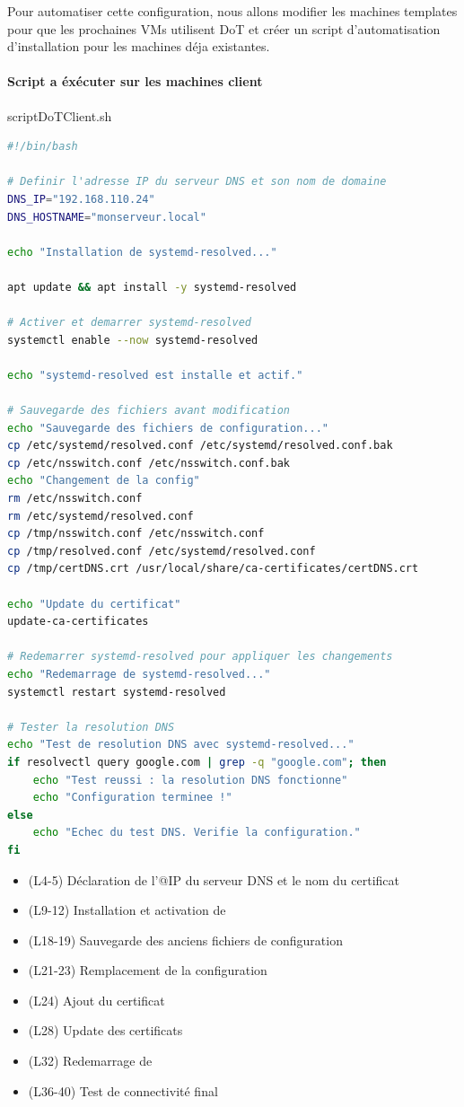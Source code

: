 \documentclass{article}
\begin{document}
Pour automatiser cette configuration, nous allons modifier les machines templates pour que les prochaines VMs utilisent DoT et créer un script d'automatisation d'installation pour les machines déja existantes.

\paragraph{Script a éxécuter sur les machines client\\}
\begin{codebox}{scriptDoTClient.sh}
\begin{lstlisting}[language=Bash]
#!/bin/bash

# Definir l'adresse IP du serveur DNS et son nom de domaine
DNS_IP="192.168.110.24"
DNS_HOSTNAME="monserveur.local"

echo "Installation de systemd-resolved..."

apt update && apt install -y systemd-resolved

# Activer et demarrer systemd-resolved
systemctl enable --now systemd-resolved

echo "systemd-resolved est installe et actif."

# Sauvegarde des fichiers avant modification
echo "Sauvegarde des fichiers de configuration..."
cp /etc/systemd/resolved.conf /etc/systemd/resolved.conf.bak
cp /etc/nsswitch.conf /etc/nsswitch.conf.bak
echo "Changement de la config"
rm /etc/nsswitch.conf
rm /etc/systemd/resolved.conf
cp /tmp/nsswitch.conf /etc/nsswitch.conf
cp /tmp/resolved.conf /etc/systemd/resolved.conf
cp /tmp/certDNS.crt /usr/local/share/ca-certificates/certDNS.crt

echo "Update du certificat"
update-ca-certificates

# Redemarrer systemd-resolved pour appliquer les changements
echo "Redemarrage de systemd-resolved..."
systemctl restart systemd-resolved

# Tester la resolution DNS
echo "Test de resolution DNS avec systemd-resolved..."
if resolvectl query google.com | grep -q "google.com"; then
    echo "Test reussi : la resolution DNS fonctionne"
    echo "Configuration terminee !"
else
    echo "Echec du test DNS. Verifie la configuration."
fi
\end{lstlisting}
\end{codebox}

\begin{itemize}
	\item (L4-5) Déclaration de l'@IP du serveur DNS et le nom du certificat
	\item (L9-12) Installation et activation de 
	\item (L18-19) Sauvegarde des anciens fichiers de configuration
	\item (L21-23) Remplacement de la configuration
	\item (L24) Ajout du certificat
	\item (L28) Update des certificats
	\item (L32) Redemarrage de 
	\item (L36-40) Test de connectivité final
\end{itemize}
\end{document}
